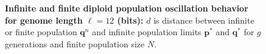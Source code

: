 \begin{figure}[H]
\begin{center}
{}


\caption{\textbf{Infinite and finite diploid population oscillation behavior for genome length $\ell = 12$ (bits):} $d$ is
  distance between infinite or finite population ${\bm q}^n$ and infinite
  population limits ${{\bm p}^\ast}$ and ${{\bm q}^{\ast}}$ for $g$ generations and finite population size $N$.}
\label{oscillation_12d}
\end{center}
\end{figure}





